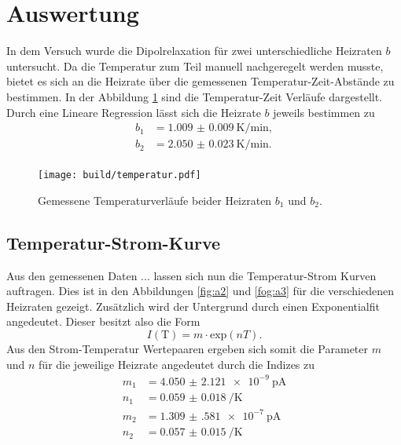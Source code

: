 \section{Auswertung}

In dem Versuch wurde die Dipolrelaxation für zwei unterschiedliche Heizraten $b$ untersucht. Da die Temperatur zum Teil manuell nachgeregelt werden musste, bietet es sich an die Heizrate über
die gemessenen Temperatur-Zeit-Abstände zu bestimmen. In der Abbildung \ref{fig:a1} sind die Temperatur-Zeit Verläufe dargestellt. Durch eine Lineare Regression lässt sich die Heizrate $b$ jeweils bestimmen zu
\begin{align*}
    b_1 &= \SI{1.009(9)}{\kelvin\per\minute},\\
    b_2 &= \SI{2.050(23)}{\kelvin\per\minute}.\\
\end{align*}
\begin{figure}
    \centering
    \texttt{[image: build/temperatur.pdf]}
    \caption{Gemessene Temperaturverläufe beider Heizraten $b_1$ und $b_2$.
            }
    \label{fig:a1}
\end{figure}
\subsection{Temperatur-Strom-Kurve}

Aus den gemessenen Daten ... lassen sich nun die Temperatur-Strom Kurven auftragen. Dies ist in den Abbildungen \ref{fig:a2} und \ref{fog:a3} für die verschiedenen Heizraten gezeigt. Zusätzlich wird der Untergrund durch einen Exponentialfit angedeutet. 
Dieser besitzt also die Form
\begin{equation*}
I(\text{T}) = m \cdot \text{exp} \left(nT\right).
\end{equation*}
Aus den Strom-Temperatur Wertepaaren ergeben sich somit die Parameter $m$ und $n$ für die jeweilige Heizrate angedeutet durch die Indizes zu
\begin{align*}
m_1 &= \SI{4.050(2121)e-9}{\pico\ampere}\\  
n_1 &= \SI{0.059(18)}{\per\kelvin}\\ 
m_2 &= \SI{1.309(581)e-7}{\pico\ampere}\\ 
n_2 &= \SI{0.057(15)}{\per\kelvin}\\ 
\end{align*}

